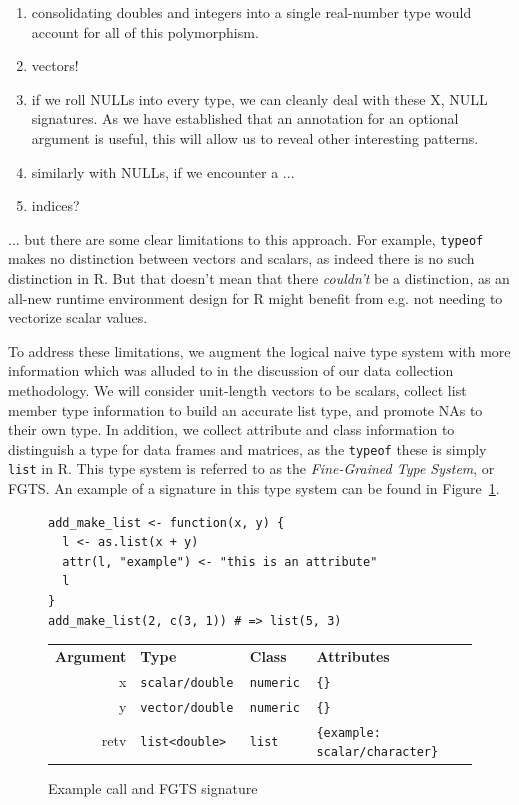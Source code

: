 \documentclass[acmsmall,10pt,review,anonymous]{acmart}\settopmatter{printfolios=true,printccs=false,printacmref=false}
\newcommand{\code}[1]{\lstinline|#1|\xspace}
\begin{document}
\begin{enumerate}

	\item consolidating doubles and integers into a single real-number type would account for all of this polymorphism.
	
	\item vectors!
	
	\item if we roll NULLs into every type, we can cleanly deal with these X, NULL signatures.
	As we have established that an annotation for an optional argument is useful, this will allow us to reveal other interesting patterns.
	
	\item similarly with NULLs, if we encounter a ...
		
	\item indices?

\end{enumerate}


... but there are some clear limitations to this approach.  For
example, \code{typeof} makes no distinction between vectors and scalars, as
indeed there is no such distinction in R.  But that doesn't mean that there
{\it couldn't} be a distinction, as an all-new runtime environment design
for R might benefit from e.g. not needing to vectorize scalar values.

To address these limitations, we augment the logical naive type system with
more information which was alluded to in the discussion of our data
collection methodology.  We will consider unit-length vectors to be scalars,
collect list member type information to build an accurate list type, and
promote NAs to their own type.  In addition, we collect attribute and class
information to distinguish a type for data frames and matrices, as the
\code{typeof} these is simply {\tt list} in R.  This type system is referred
to as the {\it Fine-Grained Type System}, or FGTS.  An example of a signature in
this type system can be found in Figure~\ref{fig:exFGTS}.

\begin{figure}[!hb]{\small\begin{lstlisting}[style=R]
add_make_list <- function(x, y) {
  l <- as.list(x + y)
  attr(l, "example") <- "this is an attribute"
  l
}
add_make_list(2, c(3, 1)) # => list(5, 3)
\end{lstlisting}}
\begin{tabular}{@{}r|l|l|l@{}}\hline
\bf Argument & \bf Type & \bf Class &\bf Attributes \\
x & \tt scalar/double & \tt numeric & \tt \{\} \\
y & \tt vector/double & \tt numeric & \tt \{\} \\
retv & \tt list<double> & \tt list & \tt \{example: scalar/character\}  
\end{tabular}
\caption{Example call and FGTS signature}\label{fig:exFGTS}\end{figure}
\end{document}
